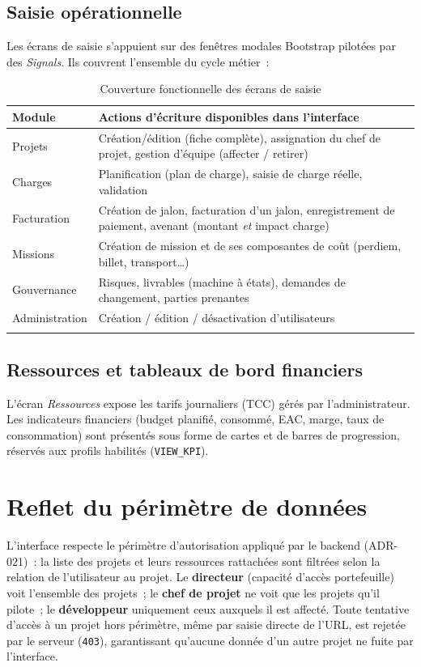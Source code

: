 \subsection{Saisie opérationnelle}
Les écrans de saisie s'appuient sur des fenêtres modales Bootstrap pilotées par des \emph{Signals}.
Ils couvrent l'ensemble du cycle métier~:

\begin{longtable}{|m{3.6cm}|m{10.4cm}|}
\hline
\textbf{Module} & \textbf{Actions d'écriture disponibles dans l'interface} \\
\hline
\endhead
\endfoot
\endlastfoot
\hline
Projets & Création/édition (fiche complète), assignation du chef de projet, gestion d'équipe (affecter / retirer) \\
\hline
Charges & Planification (plan de charge), saisie de charge réelle, validation \\
\hline
Facturation & Création de jalon, facturation d'un jalon, enregistrement de paiement, avenant (montant \emph{et} impact charge) \\
\hline
Missions & Création de mission et de ses composantes de coût (perdiem, billet, transport\dots) \\
\hline
Gouvernance & Risques, livrables (machine à états), demandes de changement, parties prenantes \\
\hline
Administration & Création / édition / désactivation d'utilisateurs \\
\hline
\caption{Couverture fonctionnelle des écrans de saisie}
\label{tab:front-forms}
\end{longtable}

\subsection{Ressources et tableaux de bord financiers}
L'écran \emph{Ressources} expose les tarifs journaliers (TCC) gérés par l'administrateur. Les
indicateurs financiers (budget planifié, consommé, EAC, marge, taux de consommation) sont présentés
sous forme de cartes et de barres de progression, réservés aux profils habilités (\texttt{VIEW\_KPI}).

\section{Reflet du périmètre de données}

L'interface respecte le périmètre d'autorisation appliqué par le backend (ADR-021)~: la liste des
projets et leurs ressources rattachées sont filtrées selon la relation de l'utilisateur au projet.
Le \textbf{directeur} (capacité d'accès portefeuille) voit l'ensemble des projets~; le \textbf{chef
de projet} ne voit que les projets qu'il pilote~; le \textbf{développeur} uniquement ceux auxquels il
est affecté. Toute tentative d'accès à un projet hors périmètre, même par saisie directe de l'URL,
est rejetée par le serveur (\texttt{403}), garantissant qu'aucune donnée d'un autre projet ne fuite
par l'interface.

